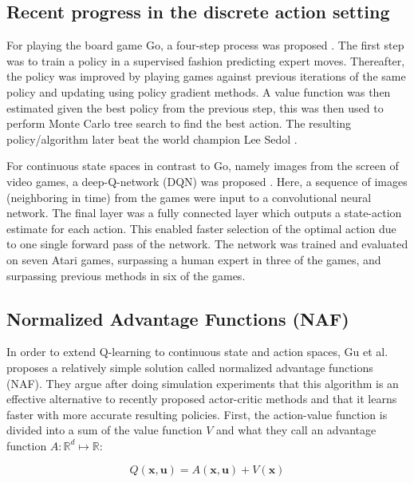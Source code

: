 \subsection{Recent progress in the discrete action setting}

For playing the board game Go, a four-step process was proposed
\cite{silver2016mastering}. The first step was to train a policy in a
supervised fashion predicting expert moves. Thereafter, the policy was improved
by playing games against previous iterations of the same policy and updating
using policy gradient methods. A value function was then estimated given the
best policy from the previous step, this was then used to perform Monte Carlo
tree search to find the best action. The resulting policy/algorithm later beat the world
champion Lee Sedol \cite{deepmind_2017}.

For continuous state spaces in contrast to Go, namely images from the screen of
video games, a deep-Q-network (DQN) was proposed \cite{mnih2013playing}. Here,
a sequence of images (neighboring in time) from the games were input to a
convolutional neural network. The final layer was a fully connected layer which
outputs a state-action estimate for each action. This enabled faster selection
of the optimal action due to one single forward pass of the network. The
network was trained and evaluated on seven Atari games, surpassing a human
expert in three of the games, and surpassing previous methods in six of the
games.


\subsection{Normalized Advantage Functions (NAF)}

In order to extend Q-learning to continuous state and action spaces, Gu et al.
\cite{gu2016continuous} proposes a relatively simple solution called normalized
advantage functions (NAF). They argue after doing simulation experiments that
this algorithm is an effective alternative to recently proposed actor-critic
methods and that it learns faster with more accurate resulting policies. First,
the action-value function is divided into a sum of the value function $V$ and
what they call an advantage function $A : \mathbb{R}^d \longmapsto \mathbb{R}$:

\begin{equation}
    Q(\mathbf{x}, \mathbf{u}) = A(\mathbf{x}, \mathbf{u}) + V(\mathbf{x})
\end{equation}

